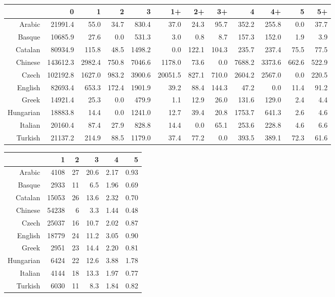 \documentclass[paper=a4, fontsize=11pt]{scrartcl} %
\begin{document}
\begin{table}[ht]
\centering
\begin{tabular}{rrrrrrrrrrrr}
  \hline
 & 0 & 1 & 2 & 3 & 1+ & 2+ & 3+ & 4 & 4+ & 5 & 5+ \\ 
  \hline
Arabic & 21991.4 & 55.0 & 34.7 & 830.4 & 37.0 & 24.3 & 95.7 & 352.2 & 255.8 & 0.0 & 37.7 \\ 
  Basque & 10685.9 & 27.6 & 0.0 & 531.3 & 3.0 & 0.8 & 8.7 & 157.3 & 152.0 & 1.9 & 3.9 \\ 
  Catalan & 80934.9 & 115.8 & 48.5 & 1498.2 & 0.0 & 122.1 & 104.3 & 235.7 & 237.4 & 75.5 & 77.5 \\ 
  Chinese & 143612.3 & 2982.4 & 750.8 & 7046.6 & 1178.0 & 73.6 & 0.0 & 7688.2 & 3373.6 & 662.6 & 522.9 \\ 
  Czech & 102192.8 & 1627.0 & 983.2 & 3900.6 & 20051.5 & 827.1 & 710.0 & 2604.2 & 2567.0 & 0.0 & 220.5 \\ 
  English & 82693.4 & 653.3 & 172.4 & 1901.9 & 39.2 & 88.4 & 144.3 & 47.2 & 0.0 & 11.4 & 91.2 \\ 
  Greek & 14921.4 & 25.3 & 0.0 & 479.9 & 1.1 & 12.9 & 26.0 & 131.6 & 129.0 & 2.4 & 4.4 \\ 
  Hungarian & 18883.8 & 14.4 & 0.0 & 1241.0 & 12.7 & 39.4 & 20.8 & 1753.7 & 641.3 & 2.6 & 4.6 \\ 
  Italian & 20160.4 & 87.4 & 27.9 & 828.8 & 14.4 & 0.0 & 65.1 & 253.6 & 228.8 & 4.6 & 6.6 \\ 
  Turkish & 21137.2 & 214.9 & 88.5 & 1179.0 & 37.4 & 77.2 & 0.0 & 393.5 & 389.1 & 72.3 & 61.6 \\ 
   \hline
\end{tabular}
\end{table}

\begin{table}[ht]
\centering
\begin{tabular}{rrrrrr}
  \hline
 & 1 & 2 & 3 & 4 & 5 \\ 
  \hline
Arabic & 4108 & 27 & 20.6 & 2.17 & 0.93 \\ 
  Basque & 2933 & 11 & 6.5 & 1.96 & 0.69 \\ 
  Catalan & 15053 & 26 & 13.6 & 2.32 & 0.70 \\ 
  Chinese & 54238 & 6 & 3.3 & 1.44 & 0.48 \\ 
  Czech & 25037 & 16 & 10.7 & 2.02 & 0.87 \\ 
  English & 18779 & 24 & 11.2 & 3.05 & 0.90 \\ 
  Greek & 2951 & 23 & 14.4 & 2.20 & 0.81 \\ 
  Hungarian & 6424 & 22 & 12.6 & 3.88 & 1.78 \\ 
  Italian & 4144 & 18 & 13.3 & 1.97 & 0.77 \\ 
  Turkish & 6030 & 11 & 8.3 & 1.84 & 0.82 \\ 
   \hline
\end{tabular}
\end{table}
\end{document}
